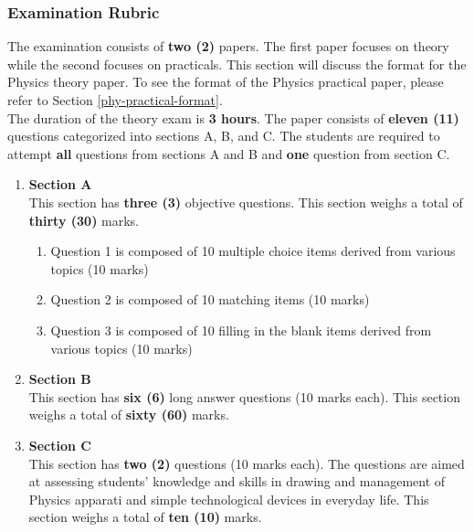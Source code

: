\subsubsection{Examination Rubric}
\noindent The examination consists of \textbf{two (2)} papers. The first paper focuses on theory while the second focuses on practicals. This section will discuss the format for the Physics theory paper. To see the format of the Physics practical paper, please refer to Section \ref{phy-practical-format}. \\

\noindent The duration of the theory exam is \textbf{3 hours}. The paper consists of \textbf{eleven (11)} questions categorized into sections A, B, and C. The students are required to attempt \textbf{all} questions from sections A and B and \textbf{one} question from section C. 
\begin{enumerate}
	\item \textbf{Section A} \\
	This section has \textbf{three (3)} objective questions. This section weighs a total of \textbf{thirty (30)} marks.
	\begin{enumerate}
		\item Question 1 is composed of 10 multiple choice items derived from various topics (10 marks)
		\item Question 2 is composed of 10 matching items (10 marks)
		\item Question 3 is composed of 10 filling in the blank items derived from various topics (10 marks)
	\end{enumerate}
	
	\item \textbf{Section B} \\
	This section has \textbf{six (6)} long answer questions (10 marks each). This section weighs a total of \textbf{sixty (60)} marks.
	
	\item \textbf{Section C} \\
	This section has \textbf{two (2)} questions (10 marks each). The questions are aimed at assessing students' knowledge and skills in drawing and management of Physics apparati and simple technological devices in everyday life. This section weighs a total of \textbf{ten (10)} marks. 
\end{enumerate}


